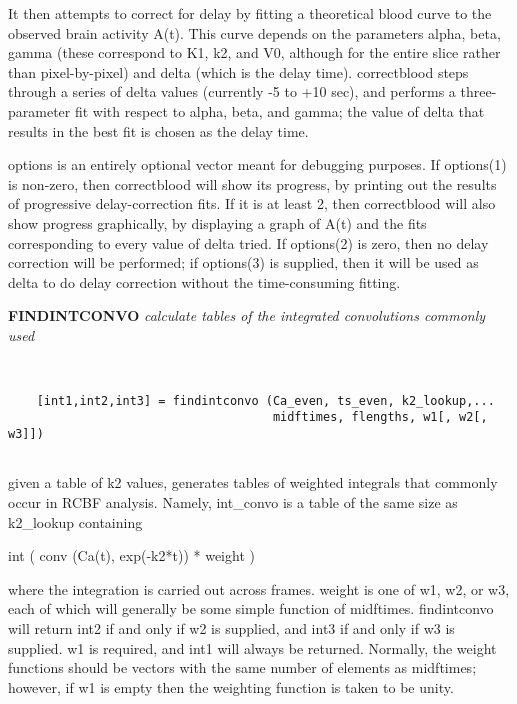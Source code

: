    It then attempts to correct for delay by fitting a theoretical blood
   curve to the observed brain activity A(t).  This curve depends
   on the parameters alpha, beta, gamma (these correspond to K1, k2,
   and V0, although for the entire slice rather than pixel-by-pixel) and
   delta (which is the delay time).  correctblood steps through a series
   of delta values (currently -5 to +10 sec), and performs a three-
   parameter fit with respect to alpha, beta, and gamma; the value of
   delta that results in the best fit is chosen as the delay time.
 
   options is an entirely optional vector meant for debugging purposes.
   If options(1) is non-zero, then correctblood will show its progress,
   by printing out the results of progressive delay-correction fits.  If 
   it is at least 2, then correctblood will also show progress graphically,
   by displaying a graph of A(t) and the fits corresponding to every
   value of delta tried.  If options(2) is zero, then no delay correction
   will be performed; if options(3) is supplied, then it will be
   used as delta to do delay correction without the time-consuming
   fitting.
\newpage


{\large\bf FINDINTCONVO} {\em   calculate tables of the integrated convolutions commonly used}
\begin{verbatim}


    [int1,int2,int3] = findintconvo (Ca_even, ts_even, k2_lookup,...
                                     midftimes, flengths, w1[, w2[, w3]])


\end{verbatim}

  given a table of k2 values, generates tables of weighted integrals
  that commonly occur in RCBF analysis.  Namely, int\_convo is a table of
  the same size as k2\_lookup containing
 
        int ( conv (Ca(t), exp(-k2*t)) * weight )
 
  where the integration is carried out across frames.  weight is
  one of w1, w2, or w3, each of which will generally be some simple
  function of midftimes.  findintconvo will return int2 if and only if
  w2 is supplied, and int3 if and only if w3 is supplied.  w1 is 
  required, and int1 will always be returned.  Normally, the weight
  functions should be vectors with the same number of elements as
  midftimes; however, if w1 is empty then the weighting function 
  is taken to be unity.
 
